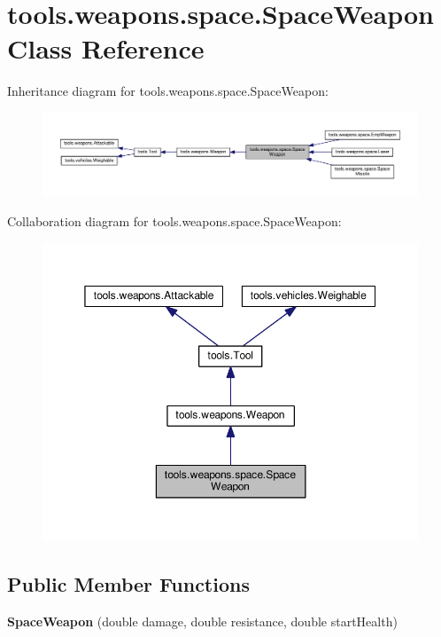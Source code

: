 \hypertarget{classtools_1_1weapons_1_1space_1_1_space_weapon}{}\section{tools.\+weapons.\+space.\+Space\+Weapon Class Reference}
\label{classtools_1_1weapons_1_1space_1_1_space_weapon}


Inheritance diagram for tools.\+weapons.\+space.\+Space\+Weapon\+:
\nopagebreak
\begin{figure}[H]
\begin{center}
\leavevmode
\includegraphics[width=350pt]{classtools_1_1weapons_1_1space_1_1_space_weapon__inherit__graph}
\end{center}
\end{figure}


Collaboration diagram for tools.\+weapons.\+space.\+Space\+Weapon\+:
\nopagebreak
\begin{figure}[H]
\begin{center}
\leavevmode
\includegraphics[width=350pt]{classtools_1_1weapons_1_1space_1_1_space_weapon__coll__graph}
\end{center}
\end{figure}
\subsection*{Public Member Functions}
\begin{DoxyCompactItemize}
\item 
{\bfseries Space\+Weapon} (double damage, double resistance, double start\+Health)\hypertarget{classtools_1_1weapons_1_1space_1_1_space_weapon_ae146d99ea131e9df2bb618de1569a4c9}{}\label{classtools_1_1weapons_1_1space_1_1_space_weapon_ae146d99ea131e9df2bb618de1569a4c9}

\end{DoxyCompactItemize}
